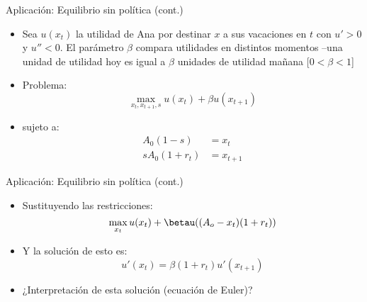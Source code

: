 \documentclass[14pt,aspectratio=169]{beamer}
\begin{document}
\begin{frame}{Aplicación: Equilibrio sin política (cont.)}
  \begin{itemize}
  \item Sea $u(x_{t})$ la utilidad de Ana por destinar $x$ a sus
    vacaciones en $t$ con $u'>0$ y $u''<0$. El parámetro $\beta$
    compara utilidades en distintos momentos --una unidad de utilidad
    hoy es igual a $\beta$ unidades de utilidad mañana [$0<\beta<1$]
  \item Problema:
    \begin{equation*}
      \max_{x_{t},x_{t+1},s} u(x_{t})+\beta u(x_{t+1})
    \end{equation*}
  \item sujeto a:
    \begin{align*}
      A_{0}(1-s)&=x_{t} \\

     sA_{0}(1+r_{t})&=x_{t+1} 
      \end{align*}
    \end{itemize}

\end{frame}



\begin{frame}{Aplicación: Equilibrio sin política (cont.)}
  \begin{itemize}
  \item Sustituyendo las restricciones:
    \begin{equation*}
\max_{x_{t}}u(x_{t})+\betau((A_{o}-x_{t})(1+r_{t})) 
\end{equation*}
\item Y la  solución de esto es:
  \begin{equation*}
u'(x_{t})=\beta(1+r_{t})u'(x_{t+1})
\end{equation*}
\item ¿Interpretación de esta solución (ecuación de Euler)?
    \end{itemize}

\end{frame}
\end{document}
